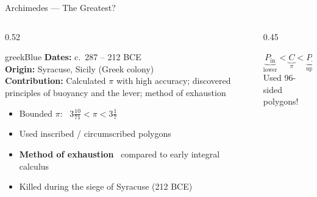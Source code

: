 \begin{frame}[shrink=22]{Archimedes --- The Greatest?}

  \begin{columns}[T]
    \begin{column}{0.52\textwidth}
      \begin{personbox}{greekBlue}
        \small
        \textbf{Dates:} c.\ 287 -- 212 BCE\\
        \textbf{Origin:} Syracuse, Sicily (Greek colony)\\
        \textbf{Contribution:} Calculated $\pi$ with high accuracy; discovered
        principles of buoyancy and the lever; method of exhaustion
      \end{personbox}

      \vspace{0.3em}
      \begin{itemize}
        \item Bounded $\pi$: \  $3\tfrac{10}{71} < \pi < 3\tfrac{1}{7}$
        \item Used inscribed / circumscribed polygons
        \item \textbf{Method of exhaustion} \textrightarrow\ compared to early integral calculus
        \item Killed during the siege of Syracuse (212 BCE)
      \end{itemize}
    \end{column}

    \begin{column}{0.45\textwidth}

      \vspace{0.3em}
      {\small\centering
        $\underbrace{P_{\text{in}}}_{\text{lower}} < \underbrace{C}_{\pi} < \underbrace{P_{\text{out}}}_{\text{upper}}$\\[0.3em]
        Used 96-sided polygons!
      }

      \vspace{0.3em}
    \end{column}
  \end{columns}

\end{frame}

